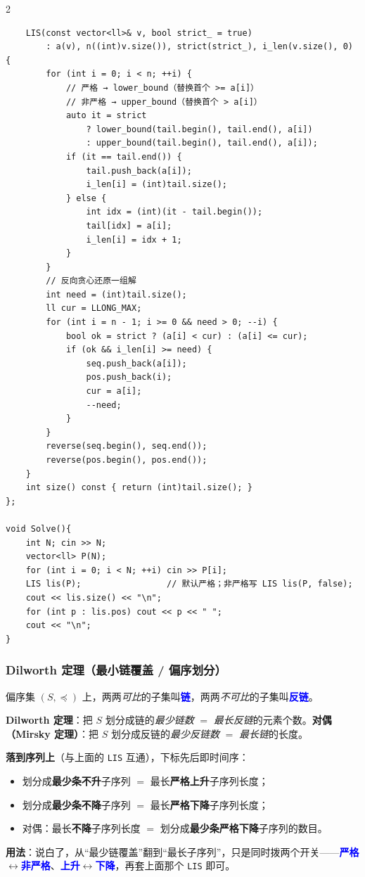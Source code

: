 \begin{multicols*}{2}
\begin{verbatim}
    LIS(const vector<ll>& v, bool strict_ = true)
        : a(v), n((int)v.size()), strict(strict_), i_len(v.size(), 0) {
        for (int i = 0; i < n; ++i) {
            // 严格 → lower_bound（替换首个 >= a[i]）
            // 非严格 → upper_bound（替换首个 > a[i]）
            auto it = strict
                ? lower_bound(tail.begin(), tail.end(), a[i])
                : upper_bound(tail.begin(), tail.end(), a[i]);
            if (it == tail.end()) {
                tail.push_back(a[i]);
                i_len[i] = (int)tail.size();
            } else {
                int idx = (int)(it - tail.begin());
                tail[idx] = a[i];
                i_len[i] = idx + 1;
            }
        }
        // 反向贪心还原一组解
        int need = (int)tail.size();
        ll cur = LLONG_MAX;
        for (int i = n - 1; i >= 0 && need > 0; --i) {
            bool ok = strict ? (a[i] < cur) : (a[i] <= cur);
            if (ok && i_len[i] >= need) {
                seq.push_back(a[i]);
                pos.push_back(i);
                cur = a[i];
                --need;
            }
        }
        reverse(seq.begin(), seq.end());
        reverse(pos.begin(), pos.end());
    }
    int size() const { return (int)tail.size(); }
};

void Solve(){
    int N; cin >> N;
    vector<ll> P(N);
    for (int i = 0; i < N; ++i) cin >> P[i];
    LIS lis(P);                 // 默认严格；非严格写 LIS lis(P, false);
    cout << lis.size() << "\n";
    for (int p : lis.pos) cout << p << " ";
    cout << "\n";
}
		\end{verbatim}

		\subsubsection{Dilworth 定理（最小链覆盖 / 偏序划分）}

		偏序集 $(S,\preceq)$ 上，两两\emph{可比}的子集叫\textcolor{blue}{\textbf{链}}，两两\emph{不可比}的子集叫\textcolor{blue}{\textbf{反链}}。

		\textbf{Dilworth 定理}：把 $S$ 划分成链的\emph{最少链数} $=$ \emph{最长反链}的元素个数。\textbf{对偶（Mirsky 定理）}：把 $S$ 划分成反链的\emph{最少反链数} $=$ \emph{最长链}的长度。

		\textbf{落到序列上}（与上面的 \texttt{LIS} 互通），下标先后即时间序：

		\begin{itemize}
			\item 划分成\textbf{最少条不升}子序列 $=$ 最长\textbf{严格上升}子序列长度；
			\item 划分成\textbf{最少条不降}子序列 $=$ 最长\textbf{严格下降}子序列长度；
			\item 对偶：最长\textbf{不降}子序列长度 $=$ 划分成\textbf{最少条严格下降}子序列的数目。
		\end{itemize}

		\textbf{用法}：说白了，从``最少链覆盖''翻到``最长子序列''，只是同时拨两个开关——\textcolor{blue}{\textbf{严格}}$\leftrightarrow$\textcolor{blue}{\textbf{非严格}}、\textcolor{blue}{\textbf{上升}}$\leftrightarrow$\textcolor{blue}{\textbf{下降}}，再套上面那个 \texttt{LIS} 即可。

	\end{multicols*}

